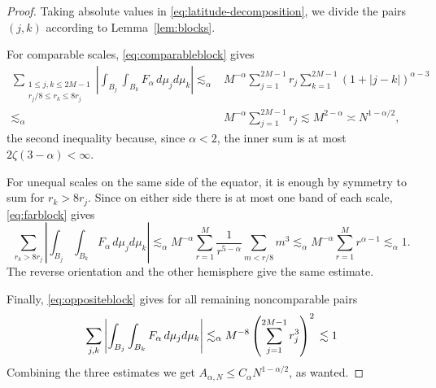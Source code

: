 \documentclass[11pt]{amsart}
\begin{document}
\begin{proof}
Taking absolute values in
\eqref{eq:latitude-decomposition}, we divide the pairs $(j,k)$ according to
Lemma~\ref{lem:blocks}.

For comparable scales, \eqref{eq:comparableblock} gives
\begin{align*}
 \sum_{\substack{1\le j,k\le2M-1\\r_j/8\le r_k\le8r_j}}
 \left|
 \int_{B_j}\int_{B_k}F_\alpha\,d\mu_jd\mu_k
 \right|
 \lesssim_\alpha&
 M^{-\alpha}
 \sum_{j=1}^{2M-1}r_j
 \sum_{k=1}^{2M-1}(1+|j-k|)^{\alpha-3}\\
 \lesssim_\alpha&
 M^{-\alpha}
 \sum_{j=1}^{2M-1}r_j\lesssim M^{2-\alpha}\asymp N^{1-\alpha/2},
\end{align*}
the second inequality because,
since $\alpha<2$, the inner sum is at most $2\zeta(3-\alpha)<\infty$.


For unequal scales on the same side of the equator, it is enough by
symmetry to sum for $r_k>8r_j$. Since on either side there is at most one band
of each scale, \eqref{eq:farblock} gives
\[
 \sum_{r_k>8r_j}
 \left|
 \int_{B_j}\int_{B_k}F_\alpha\,d\mu_jd\mu_k
 \right|
 \lesssim_\alpha M^{-\alpha}
 \sum_{r=1}^{M}\frac1{r^{5-\alpha}}
 \sum_{m<r/8}m^3
 \lesssim_\alpha
 M^{-\alpha}
 \sum_{r=1}^{M}{r^{\alpha-1}}\lesssim_\alpha 1.
\]
The reverse orientation and the other
hemisphere give the same estimate.

Finally, \eqref{eq:oppositeblock} gives for all remaining noncomparable
pairs
\[
 \sum_{j,k}
 \left|
 \int_{B_j}\int_{B_k}F_\alpha\,d\mu_jd\mu_k
 \right|
 \lesssim_\alpha M^{-8}
 \left(\sum_{j=1}^{2M-1}r_j^3\right)^2\\
 \lesssim 1
\]
Combining the three estimates we get $
 A_{\alpha,N}\le C_\alpha N^{1-\alpha/2}$, as wanted.

\end{proof}



\end{document}
